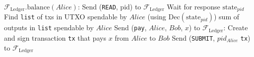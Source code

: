   \label{alg:temp:formalfledger}
  \begin{algorithmic}[1]
    \State $\mathcal{F}_{\mathrm{Ledger}}\mathrm{.balance}\left(Alice\right)$:
    \State
    \State Send (\texttt{READ}, pid) to $\mathcal{F}_{\mathrm{Ledger}}$
    \State Wait for response $\mathrm{state}_{pid}$
    \State Find \texttt{list} of txs in UTXO spendable by $Alice$ (using
    $\mathrm{Dec}\left(\mathrm{state}_{pid}\right)$) 
    \State \Return sum of outputs in \texttt{list} spendable by $Alice$
    \State
    \State
    \State Send (\texttt{pay}, $Alice$, $Bob$, $x$) to
    $\mathcal{F}_{\mathrm{Ledger}}$:
    \State
    \State Create and sign transaction \texttt{tx} that pays $x$ from $Alice$ to
    $Bob$ 
    \State Send (\texttt{SUBMIT}, $pid_{Alice}$ \texttt{tx}) to
    $\mathcal{F}_{\mathrm{Ledger}}$
  \end{algorithmic}
\hrulefill

